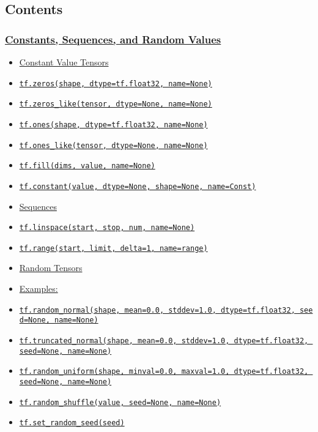 

\subsection{Contents}\label{contents}

\subsubsection{\texorpdfstring{\protect\hyperlink{AUTOGENERATED-constants--sequences--and-random-values}{Constants,
Sequences, and Random
Values}}{Constants, Sequences, and Random Values}}\label{constants-sequences-and-random-values-1}

\begin{itemize}
\tightlist
\item
  \protect\hyperlink{AUTOGENERATED-constant-value-tensors}{Constant
  Value Tensors}
\item
  \protect\hyperlink{zeros}{\texttt{tf.zeros(shape,\ dtype=tf.float32,\ name=None)}}
\item
  \protect\hyperlink{zerosux5flike}{\texttt{tf.zeros\_like(tensor,\ dtype=None,\ name=None)}}
\item
  \protect\hyperlink{ones}{\texttt{tf.ones(shape,\ dtype=tf.float32,\ name=None)}}
\item
  \protect\hyperlink{onesux5flike}{\texttt{tf.ones\_like(tensor,\ dtype=None,\ name=None)}}
\item
  \protect\hyperlink{fill}{\texttt{tf.fill(dims,\ value,\ name=None)}}
\item
  \protect\hyperlink{constant}{\texttt{tf.constant(value,\ dtype=None,\ shape=None,\ name=\textquotesingle{}Const\textquotesingle{})}}
\item
  \protect\hyperlink{AUTOGENERATED-sequences}{Sequences}
\item
  \protect\hyperlink{linspace}{\texttt{tf.linspace(start,\ stop,\ num,\ name=None)}}
\item
  \protect\hyperlink{range}{\texttt{tf.range(start,\ limit,\ delta=1,\ name=\textquotesingle{}range\textquotesingle{})}}
\item
  \protect\hyperlink{AUTOGENERATED-random-tensors}{Random Tensors}
\item
  \protect\hyperlink{AUTOGENERATED-examples-}{Examples:}
\item
  \protect\hyperlink{randomux5fnormal}{\texttt{tf.random\_normal(shape,\ mean=0.0,\ stddev=1.0,\ dtype=tf.float32,\ seed=None,\ name=None)}}
\item
  \protect\hyperlink{truncatedux5fnormal}{\texttt{tf.truncated\_normal(shape,\ mean=0.0,\ stddev=1.0,\ dtype=tf.float32,\ seed=None,\ name=None)}}
\item
  \protect\hyperlink{randomux5funiform}{\texttt{tf.random\_uniform(shape,\ minval=0.0,\ maxval=1.0,\ dtype=tf.float32,\ seed=None,\ name=None)}}
\item
  \protect\hyperlink{randomux5fshuffle}{\texttt{tf.random\_shuffle(value,\ seed=None,\ name=None)}}
\item
  \protect\hyperlink{setux5frandomux5fseed}{\texttt{tf.set\_random\_seed(seed)}}
\end{itemize}

